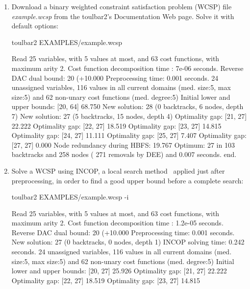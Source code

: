 \begin{enumerate}
\item Download a binary weighted constraint satisfaction problem (WCSP) file {\em example.wcsp} from the toulbar2's Documentation Web page. Solve it with default options:
\begin{DoxyCode}
	toulbar2 EXAMPLES/example.wcsp
\end{DoxyCode}
{\scriptsize
\begin{DoxyCode}
Read 25 variables, with 5 values at most, and 63 cost functions, with maximum arity 2.
Cost function decomposition time : 7e-06 seconds.
Reverse DAC dual bound: 20 (+10.000%
Preprocessing time: 0.001 seconds.
24 unassigned variables, 116 values in all current domains (med. size:5, max size:5) and 62 non-unary cost functions (med. degree:5)
Initial lower and upper bounds: [20, 64] 68.750%
New solution: 28 (0 backtracks, 6 nodes, depth 7)
New solution: 27 (5 backtracks, 15 nodes, depth 4)
Optimality gap: [21, 27] 22.222 %
Optimality gap: [22, 27] 18.519 %
Optimality gap: [23, 27] 14.815 %
Optimality gap: [24, 27] 11.111 %
Optimality gap: [25, 27] 7.407 %
Optimality gap: [27, 27] 0.000 %
Node redundancy during HBFS: 19.767 %
Optimum: 27 in 103 backtracks and 258 nodes ( 271 removals by DEE) and 0.007 seconds.
end.
\end{DoxyCode}}
\item Solve a WCSP using INCOP, a local search method~\cite{idwalk:cp04} applied just after preprocessing, in order to find a good upper bound before a complete search:
\begin{DoxyCode}
	toulbar2 EXAMPLES/example.wcsp -i
\end{DoxyCode}
{\scriptsize
\begin{DoxyCode}
Read 25 variables, with 5 values at most, and 63 cost functions, with maximum arity 2.
Cost function decomposition time : 1.2e-05 seconds.
Reverse DAC dual bound: 20 (+10.000%
Preprocessing time: 0.001 seconds.
New solution: 27 (0 backtracks, 0 nodes, depth 1)
INCOP solving time: 0.242 seconds.
24 unassigned variables, 116 values in all current domains (med. size:5, max size:5) and 62 non-unary cost functions (med. degree:5)
Initial lower and upper bounds: [20, 27] 25.926%
Optimality gap: [21, 27] 22.222 %
Optimality gap: [22, 27] 18.519 %
Optimality gap: [23, 27] 14.815 %

\end{DoxyCode}}
\end{enumerate}
